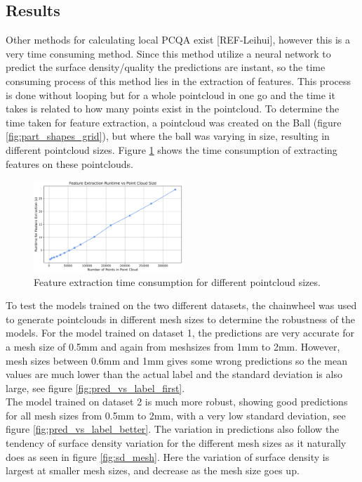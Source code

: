 \subsection{Results}

Other methods for calculating local PCQA exist [REF-Leihui], however this is a very time consuming method. Since this method utilize a neural network to predict the surface density/quality the predictions are instant, so the time consuming process of this method lies in the extraction of features. This process is done without looping but for a whole pointcloud in one go and the time it takes is related to how many points exist in the pointcloud. To determine the time taken for feature extraction, a pointcloud was created on the Ball (figure \ref{fig:part_shapes_grid}), but where the ball was varying in size, resulting in different pointcloud sizes. Figure \ref{fig:time} shows the time consumption of extracting features on these pointclouds.

\begin{figure}[htbp]
    \centering
    \includegraphics[width=0.5\textwidth]{figures/time_lowQ.png}
    \caption{Feature extraction time consumption for different pointcloud sizes.}
    \label{fig:time}
\end{figure}

To test the models trained on the two different datasets, the chainwheel was used to generate pointclouds in different mesh sizes to determine the robustness of the models. For the model trained on dataset 1, the predictions are very accurate for a mesh size of 0.5mm and again from meshsizes from 1mm to 2mm. However, mesh sizes between 0.6mm and 1mm gives some wrong predictions so the mean values are much lower than the actual label and the standard deviation is also large, see figure \ref{fig:pred_vs_label_first}.\\
The model trained on dataset 2 is much more robust, showing good predictions for all mesh sizes from 0.5mm to 2mm, with a very low standard deviation, see figure \ref{fig:pred_vs_label_better}. The variation in predictions also follow the tendency of surface density variation for the different mesh sizes as it naturally does as seen in figure \ref{fig:sd_mesh}. Here the variation of surface density is largest at smaller mesh sizes, and decrease as the mesh size goes up.

